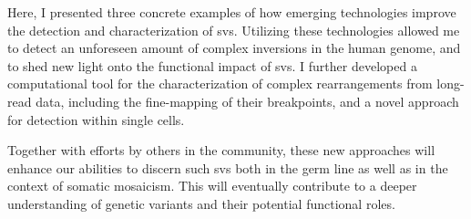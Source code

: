 Here, I presented three concrete examples of how emerging technologies improve
the detection and characterization of \acp{sv}. Utilizing these technologies
allowed me to detect an unforeseen amount of complex inversions in the human
genome, and to shed new light onto the functional impact of \acp{sv}.
I further developed a computational tool for the characterization of complex
rearrangements from long-read data, including the fine-mapping of their
breakpoints, and a novel approach for \sv detection within single cells.

Together with efforts by others in the community, these new approaches will
enhance our abilities to discern such \acp{sv} both in the germ line as well as
in the context of somatic mosaicism. This will eventually contribute to a deeper
understanding of genetic variants and their potential functional roles.


